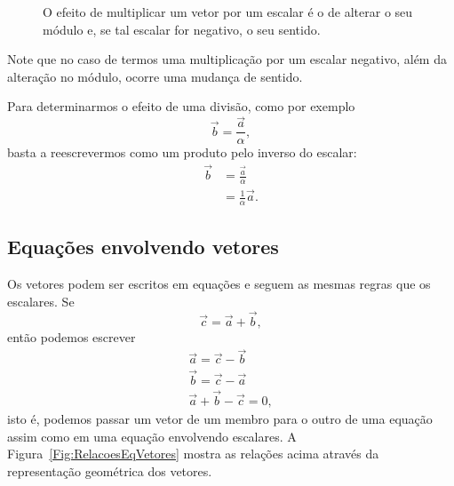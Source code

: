 \begin{figure}
\centering
{}
\caption{O efeito de multiplicar um vetor por um escalar é o de alterar o seu módulo e, se tal escalar for negativo, o seu sentido.}
\end{figure}

\noindent{}Note que no caso de termos uma multiplicação por um escalar negativo, além da alteração no módulo, ocorre uma mudança de sentido.

Para determinarmos o efeito de uma divisão, como por exemplo
\begin{equation}
    \vec{b} = \frac{\vec{a}}{\alpha},
\end{equation}
%
basta a reescrevermos como um produto pelo inverso do escalar:
\begin{align}
    \vec{b} &= \frac{\vec{a}}{\alpha} \\
    &= \frac{1}{\alpha} \vec{a}.
\end{align}

\subsection{Equações envolvendo vetores}

Os vetores podem ser escritos em equações e seguem as mesmas regras que os escalares. Se
\begin{equation}
  \vec{c} = \vec{a} + \vec{b},
\end{equation}
%
então podemos escrever
\begin{align}
  \vec{a} = \vec{c} - \vec{b} \\
  \vec{b} = \vec{c} - \vec{a} \\
  \vec{a} + \vec{b} - \vec{c} = 0,
\end{align}
%
isto é, podemos passar um vetor de um membro para o outro de uma equação assim como em uma equação envolvendo escalares. A Figura~\ref{Fig:RelacoesEqVetores} mostra as relações acima através da representação geométrica dos vetores.

